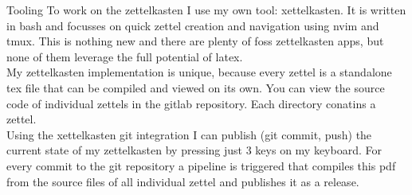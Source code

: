 \documentclass[class=article, crop=false]{standalone}
\begin{document}
\begin{zettel}{Tooling}
    To work on the zettelkasten I use my own tool: xettelkasten. It is written in bash and focusses on quick zettel creation and navigation using nvim and tmux. This is nothing new and there are plenty of foss zettelkasten apps, but none of them leverage the full potential of latex.\\

    My zettelkasten implementation is unique, because every zettel is a standalone tex file that can be compiled and viewed on its own. You can view the source code of individual zettels in the gitlab repository. Each directory conatins a zettel.\\

    Using the xettelkasten git integration I can publish (git commit, push) the current state of my zettelkasten by pressing just 3 keys on my keyboard. For every commit to the git repository a pipeline is triggered that compiles this pdf from the source files of all individual zettel and publishes it as a release.
\end{zettel}
\end{document}
